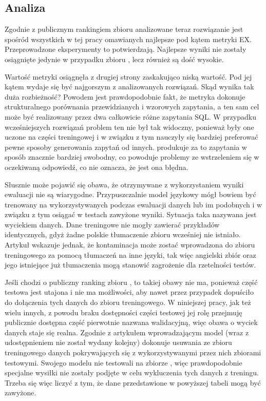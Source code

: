 \subsection{Analiza}
Zgodnie z publicznym rankingiem zbioru  analizowane teraz rozwiązanie jest spośród wszystkich w tej pracy omawianych najlepsze pod kątem metryki EX. Przeprowadzone eksperymenty to potwierdzają. Najlepsze wyniki nie zostały osiągnięte jedynie w przypadku zbioru , lecz również są dość wysokie.

Wartość metryki  osiągnęła z drugiej strony zaskakująco niską wartość. Pod jej kątem  wydaje się być najgorszym z analizowanych rozwiązań. Skąd wynika tak duża rozbieżność? Powodem jest prawdopodobnie fakt, że metryka  dokonuje strukturalnego porównania przewidzianych i wzorowych zapytania, a ten sam cel może być realizowany przez dwa całkowicie różne zapytania SQL. W przypadku wcześniejszych rozwiązań problem ten nie był tak widoczny, ponieważ były one uczone na części treningowej i w związku z tym nauczyły się bardziej preferować pewne sposoby generowania zapytań od innych.  produkuje za to zapytania w sposób znacznie bardziej swobodny, co powoduje problemy ze wstrzeleniem się w oczekiwaną odpowiedź, co nie oznacza, że jest ona błędna. 

Słusznie może pojawić się obawa, że otrzymywane z wykorzystaniem  wyniki ewaluacji nie są wiarygodne. Przypuszczalnie model językowy  mógł bowiem być trenowany na wykorzystywanych podczas ewaluacji danych lub im podobnych i w związku z tym osiągać w testach zawyżone wyniki. Sytuacja taka nazywana jest wyciekiem danych. Dane treningowe nie mogły zawierać przykładów identycznych, gdyż żadne polskie tłumaczenie zbioru  wcześniej nie istniało. Artykuł   wskazuje jednak, że kontaminacja może zostać wprowadzona do zbioru treningowego za pomocą tłumaczeń na inne języki, tak więc angielski zbiór  oraz jego istniejące już tłumaczenia mogą stanowić zagrożenie dla rzetelności testów.

Jeśli chodzi o publiczny ranking zbioru , to takiej obawy nie ma, ponieważ część testowa jest utajona i nie ma możliwości, aby  nawet przez przypadek dopuściło do dołączenia tych danych do zbioru treningowego. W niniejszej pracy, jak też wielu innych, z powodu braku dostępności części testowej jej rolę przejmuję publicznie dostępna część pierwotnie nazwana walidacyjną, więc obawa o wyciek danych staje się realna. Zgodnie z artykułem wprowadzającym model   (wraz z udostępnieniem  nie został wydany kolejny)  dokonuje usuwania ze zbioru treningowego danych pokrywających się z wykorzystywanymi przez nich zbiorami testowymi. Swojego modelu nie testowali na zbiorze , więc prawdopodobnie specjalne wysiłki nie zostały podjęte w celu wykluczenia tych danych z treningu. Trzeba się więc liczyć z tym, że dane przedstawione w powyższej tabeli mogą być zawyżone.

